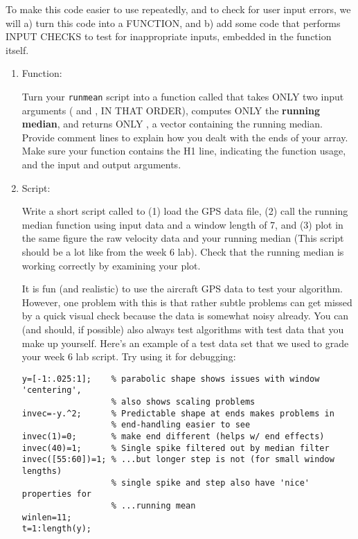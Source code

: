 \documentclass[letterpaper,12pt]{article}
\begin{document}
To make this code easier to use repeatedly, and to check for user input errors, we will a) turn
this code into a FUNCTION, and b) add some code that performs INPUT CHECKS to test for inappropriate inputs, embedded in the function itself.

\begin{enumerate}
\item{Function:  }

Turn your \verb+runmean+ script into a function called  that takes ONLY two input arguments ( and , IN THAT ORDER), computes
ONLY the {\bf running median}, and returns ONLY , a vector containing the
running median.  Provide comment lines to explain how you dealt with the ends of your array.  Make sure your function contains the H1 line,
indicating the function usage, and the input and output arguments.

\item{Script:  }

Write a short script called  to (1) load the GPS data file, (2) call the running median function using 
input data  and a window length of 7, and (3) plot in the same figure the raw velocity data  and your running 
median (This script should be a lot like  from
the week 6 lab).  Check that the running median is working correctly
by examining your plot.

It is fun (and realistic) to use the aircraft GPS data to test your algorithm.  However, one problem with this is that rather subtle problems  
can get missed by a quick visual check because the data is somewhat noisy already.  You can (and should, if possible) also always test algorithms  
with test data that you make up yourself.  Here's an example of a test data set that we used to grade your week 6 lab script.  Try using it for debugging:


\begin{lstlisting}
y=[-1:.025:1];    % parabolic shape shows issues with window 'centering', 
                  % also shows scaling problems
invec=-y.^2;      % Predictable shape at ends makes problems in 
                  % end-handling easier to see
invec(1)=0;       % make end different (helps w/ end effects)
invec(40)=1;      % Single spike filtered out by median filter
invec([55:60])=1; % ...but longer step is not (for small window lengths)
                  % single spike and step also have 'nice' properties for 
                  % ...running mean
winlen=11;         
t=1:length(y);     
\end{lstlisting}


\end{enumerate}
\end{document}
